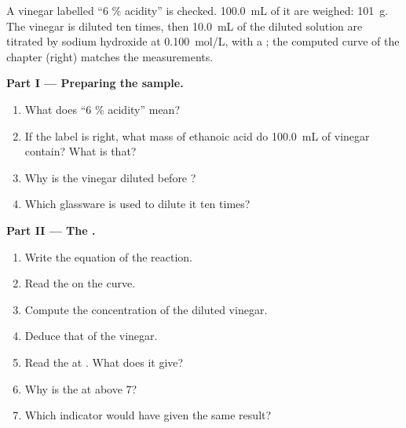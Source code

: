 \begin{problem}
\label{pb:g12:ph-conductivity-titrations:1}
A vinegar labelled ``6 \% acidity'' is checked. \qty{100.0}{mL} of it
are weighed: \qty{101}{g}. The vinegar is diluted ten times, then
\qty{10.0}{mL} of the diluted solution are titrated by sodium hydroxide
at \qty{0.100}{mol/L}, with a ; the computed curve of the
chapter (right) matches the measurements.

\medskip
\noindent\textbf{Part I --- Preparing the sample.}
\begin{enumerate}
  \item What does ``6 \% acidity'' mean?
  \item If the label is right, what mass of ethanoic acid do
        \qty{100.0}{mL} of vinegar contain? What  is
        that?
  \item Why is the vinegar diluted before ?
  \item Which glassware is used to dilute it ten times?
\end{enumerate}

\medskip
\noindent\textbf{Part II --- The .}
\begin{enumerate}[resume]
  \item Write the equation of the  reaction.
  \item Read the  on the curve.
  \item Compute the concentration of the diluted vinegar.
  \item Deduce that of the vinegar.
  \item Read the  at . What does it give?
  \item Why is the  at  above 7?
  \item Which indicator would have given the same result?
\end{enumerate}


\end{problem}
